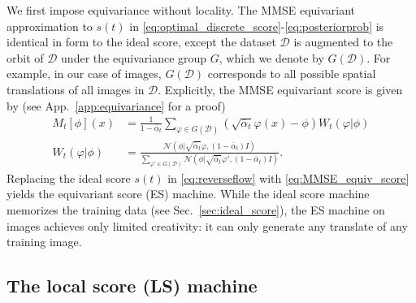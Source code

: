 \documentclass{article}
\theoremstyle{plain}
\theoremstyle{definition}
\theoremstyle{remark}
\begin{document}
We first impose equivariance without locality. The MMSE equivariant approximation to $s(t)$ in \eqref{eq:optimal_discrete_score}-\eqref{eq:posteriorprob} is identical in form to the ideal score, except the dataset $\mathcal D$ is augmented to the orbit of $\mathcal D$ under the equivariance group $G$, which we denote by $G(\mathcal D)$.  For example, in our case of images, $G(\mathcal D)$ corresponds to all possible spatial translations of all images in $\mathcal D$. Explicitly, the MMSE equivariant score is given by (see App.~\ref{app:equivariance} for a proof)  
\begin{align}
    \label{eq:MMSE_equiv_score}
    M_t[\phi](x) &= \frac{1}{1 - \bar{\alpha}_t}\sum_{\varphi \in G(\mathcal{D})} ( \sqrt{\bar{\alpha}_t} \varphi(x) - \phi ) W_t(\varphi|\phi)\\
    W_t(\varphi|\phi) &= \frac{\mathcal{N}(\phi|\sqrt{\bar{\alpha}_t} \varphi,(1 - \bar{\alpha}_t)I)}{\sum_{\varphi' \in G(\mathcal{D})} \mathcal{N}(\phi|\sqrt{\bar{\alpha}_t} \varphi',(1 - \bar{\alpha}_t)I)}.
\end{align}
Replacing the ideal score $s(t)$ in \eqref{eq:reverseflow} with \eqref{eq:MMSE_equiv_score} yields the equivariant score (ES) machine. While the ideal score machine memorizes the training data (see Sec.~\ref{sec:ideal_score}), the ES machine on images achieves only limited creativity: it can only generate any translate of any training image. 

\subsection{The local score (LS) machine}
\end{document}
